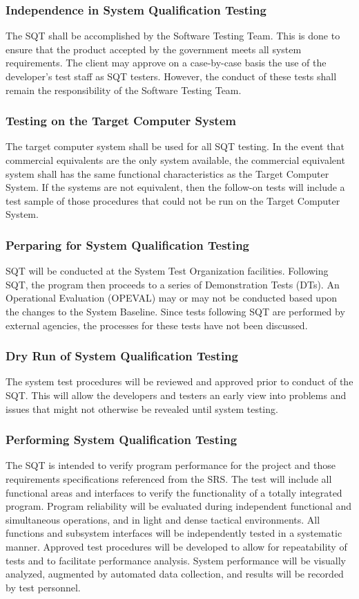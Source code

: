 \documentclass[a4paper, 11pt]{article}
\begin{document}
\subsubsection{Independence in System Qualification Testing}
The SQT shall be accomplished by the Software Testing Team. This is done to ensure that the product accepted by the government meets all system requirements. The client may approve on a case-by-case basis the use of the developer's test staff as SQT testers. However, the conduct of these tests shall remain the responsibility of the Software Testing Team.

\subsubsection{Testing on the Target Computer System}
The target computer system shall be used for all SQT testing. In the event that commercial equivalents are the only system available, the commercial equivalent system shall has the same functional characteristics as the Target Computer System. If the systems are not equivalent, then the follow-on tests will include a test sample of those procedures that could not be run on the Target Computer System.

\subsubsection{Perparing for System Qualification Testing}
SQT will be conducted at the System Test Organization facilities. Following SQT, the program then proceeds to a series of Demonstration Tests (DTs). An Operational Evaluation (OPEVAL) may or may not be conducted based upon the changes to the System Baseline. Since tests
following SQT are performed by external agencies, the processes for these tests have not been discussed.

\subsubsection{Dry Run of System Qualification Testing}
The system test procedures will be reviewed and approved prior to conduct of the SQT. This will allow the developers and testers an early view into problems and issues that might not otherwise be revealed until system testing.

\subsubsection{Performing System Qualification Testing}
The SQT is intended to verify program performance for the project and those requirements specifications referenced from the SRS. The test will include all functional areas and interfaces to verify the functionality of a totally integrated program. Program reliability will be evaluated during independent functional and simultaneous operations, and in light and dense tactical environments. All functions and subsystem interfaces will be independently tested in a systematic manner. Approved test procedures will be developed to allow for repeatability of tests and to facilitate performance analysis. System performance will be visually analyzed, augmented by automated data collection, and results will be recorded by test personnel.
\end{document}
